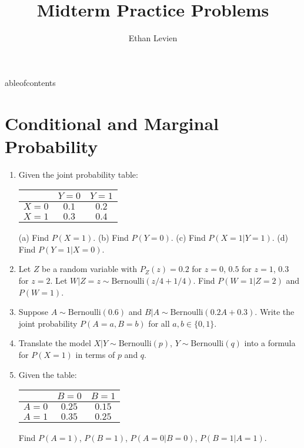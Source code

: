 
\setcounter{unit}{0}
\setcounter{section}{0}


	\title{Midterm Practice Problems}
\author{Ethan Levien}
\maketitle
	ableofcontents

\section{Conditional and Marginal Probability}
\begin{enumerate}[label=\arabic*.]
\item Given the joint probability table:
\begin{center}
\begin{tabular}{c|cc}
 & $Y=0$ & $Y=1$ \\
\hline
$X=0$ & $0.1$ & $0.2$ \\
$X=1$ & $0.3$ & $0.4$ \\
\end{tabular}
\end{center}
(a) Find $P(X=1)$.
(b) Find $P(Y=0)$.
(c) Find $P(X=1|Y=1)$.
(d) Find $P(Y=1|X=0)$.

\item Let $Z$ be a random variable with $P_Z(z) = 0.2$ for $z=0$, $0.5$ for $z=1$, $0.3$ for $z=2$. Let $W|Z=z \sim \text{Bernoulli}(z/4 + 1/4)$. Find $P(W=1|Z=2)$ and $P(W=1)$.

\item Suppose $A \sim \text{Bernoulli}(0.6)$ and $B|A \sim \text{Bernoulli}(0.2A + 0.3)$. Write the joint probability $P(A=a, B=b)$ for all $a,b \in \{0,1\}$.

\item Translate the model $X|Y \sim \text{Bernoulli}(p)$, $Y \sim \text{Bernoulli}(q)$ into a formula for $P(X=1)$ in terms of $p$ and $q$.

\item Given the table:
\begin{center}
\begin{tabular}{c|cc}
 & $B=0$ & $B=1$ \\
\hline
$A=0$ & $0.25$ & $0.15$ \\
$A=1$ & $0.35$ & $0.25$ \\
\end{tabular}
\end{center}
Find $P(A=1)$, $P(B=1)$, $P(A=0|B=0)$, $P(B=1|A=1)$.
\end{enumerate}

